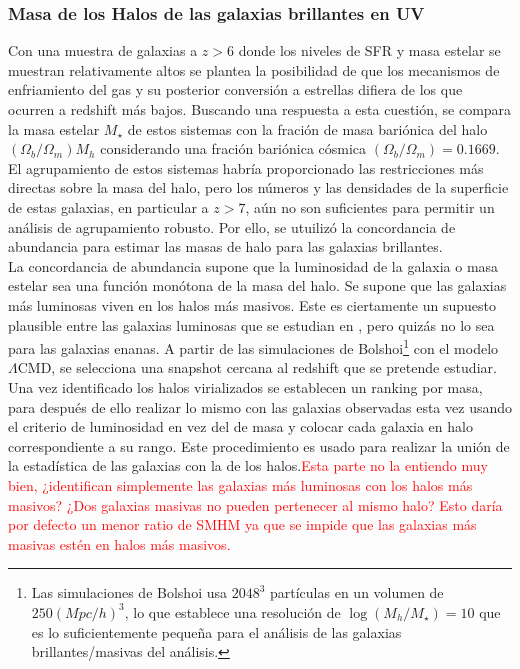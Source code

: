 \documentclass{article}
\begin{document}
\subsubsection*{Masa de los Halos de las galaxias brillantes en UV}
Con una muestra de galaxias a $z>6$ donde los niveles de SFR y masa estelar se muestran relativamente altos se plantea la posibilidad de que los mecanismos de enfriamiento del gas y su posterior conversión a estrellas difiera de los que ocurren a redshift más bajos. Buscando una respuesta a esta cuestión, se compara la masa estelar $M_\star$ de estos sistemas con la fración de masa bariónica del halo $(\Omega_b/\Omega_m)M_h$ considerando una fración bariónica cósmica $(\Omega_b/\Omega_m)=0.1669$. El agrupamiento de estos sistemas habría proporcionado las restricciones más directas sobre la masa del halo, pero los números y las densidades de la superficie de estas galaxias, en particular a $z> 7$, aún no son suficientes para permitir un análisis de agrupamiento robusto. Por ello, se utuilizó la concordancia de abundancia para estimar las masas de halo para las galaxias brillantes. \\

La concordancia de abundancia supone que la luminosidad de la galaxia o masa estelar sea una función monótona de la masa del halo. Se supone que las galaxias más luminosas viven en los halos más masivos. Este es ciertamente un supuesto plausible entre las galaxias luminosas que se estudian en \cite{finkelstein2015increasing}, pero quizás no lo sea para las galaxias enanas. A partir de las simulaciones de Bolshoi\footnote{Las simulaciones de Bolshoi usa $2048^3$ partículas en un volumen de $250 (Mpc/h)^3$, lo que establece una resolución de $\log(M_h/M_\star)=10$ que es lo suficientemente pequeña para el análisis de las galaxias brillantes/masivas del análisis.} con el modelo $\Lambda$CMD, se selecciona una snapshot cercana al redshift que se pretende estudiar. Una vez identificado los halos virializados se establecen un ranking por masa, para después de ello realizar lo mismo con las galaxias observadas esta vez usando el criterio de luminosidad en vez del de masa y colocar cada galaxia en halo correspondiente a su rango. Este procedimiento es usado para realizar la unión de la estadística de las galaxias con la de los halos.\textcolor{red}{Esta parte no la entiendo muy bien, ¿identifican simplemente las galaxias más luminosas con los halos más masivos? ¿Dos galaxias masivas no pueden pertenecer al mismo halo? Esto daría por defecto un menor ratio de SMHM ya que se impide que las galaxias más masivas estén en halos más masivos.}\\
\end{document}
